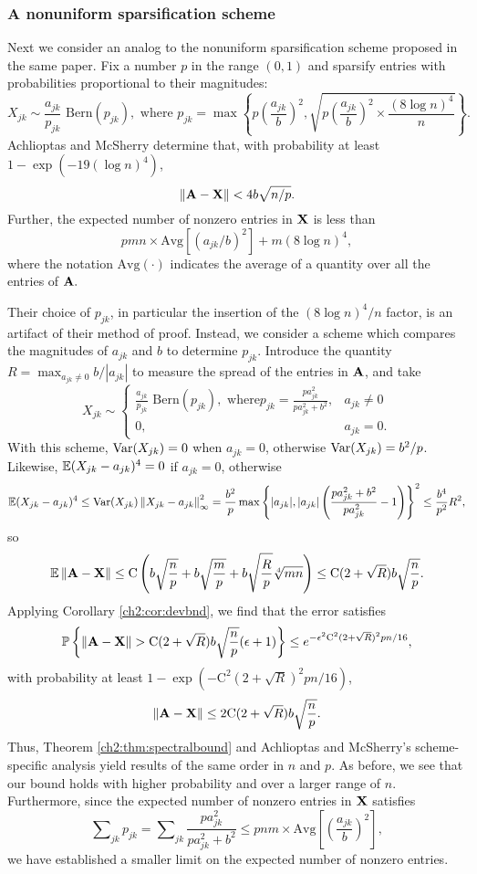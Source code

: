 \subsubsection{A nonuniform sparsification scheme}
Next we consider an analog to the nonuniform sparsification scheme proposed in
the same paper. Fix a number $p$ in the range $(0,1)$ and sparsify entries with
probabilities proportional to their magnitudes: 
\[
X_{jk}\sim \frac{a_{jk}}{p_{jk}}\text{ Bern}(p_{jk}), \text{ where }
p_{jk}=\max\left\{
p\left(\frac{a_{jk}}{b}\right)^{2},\sqrt{p\left(\frac{a_{jk}}{b}\right)^{2}
\times\frac{(8\log n)^{4}}{n}}\right\}.
\]
Achlioptas and McSherry determine that, with probability at least $1 -
\exp(-19(\log n)^4)$,
\[
\left\|\mathbf{A}-\mathbf{X}\right\|<4b\sqrt{n/p}.
\]
Further, the expected number of nonzero entries in $\mathbf{X}$ is less than
\begin{equation}
pmn\times\text{Avg}[(a_{jk}/b)^{2}]+m(8\log n)^{4},
\end{equation}
where the notation $\text{Avg}(\cdot)$ indicates the average of a
quantity over all the entries of $\mathbf{A}.$

Their choice of $p_{jk}$, in particular the insertion of the $(8\log n)^{4}/n$
factor, is an artifact of their method of proof. Instead, we consider a scheme
which compares the magnitudes of $a_{jk}$ and $b$ to determine $p_{jk}$.
Introduce the quantity $R=\max_{a_{jk}\neq0}b/|a_{jk}|$ to
measure the spread of the entries in $\mathbf{A}$, and take 
\[
X_{jk} \sim 
\begin{cases}
\frac{a_{jk}}{p_{jk}}\text{ Bern}(p_{jk}),\text{ where
}p_{jk}=\frac{pa_{jk}^{2}}{pa_{jk}^{2}+b^{2}}, & a_{jk}\neq0\\
0, & a_{jk}=0.
\end{cases}
\]
With this scheme, $\operatorname{Var}(X_{jk})=0$ when $a_{jk}=0$, otherwise
$\operatorname{Var}(X_{jk})=b^{2}/p$.
Likewise, $\mathbb{E}(X_{jk}-a_{jk})^{4}=0$ if $a_{jk}=0$, otherwise 
\[
\mathbb{E}(X_{jk}-a_{jk})^{4}\leq\operatorname{Var}(X_{jk})\left\|X_{jk}-a_{jk}\right\|_{\infty}^{2}=\frac{b^{
2}}{p}\max\left\{|a_{jk}|,|a_{jk}|\left(\frac{pa_{jk}^{2}+b^{2}}{pa_{jk}^{2}}
-1\right)\right\}^{2}\leq\frac{b^{4}}{p^{2}}R^{2},
\]
so \[
\mathbb{E}\left\|\mathbf{A}-\mathbf{X}\right\|\leq
\mathrm{C}\left(b\sqrt{\frac{n}{p}}+b\sqrt{\frac{m}{p}}+b\sqrt{\frac{R}{p}}\sqrt
[4]{mn}\right)\leq \mathrm{C}(2+\sqrt{R})b\sqrt{\frac{n}{p}}.
\]
Applying Corollary \ref{ch2:cor:devbnd}, we find that the error satisfies
\[
\Prob{\norm{\mat{A}-\mat{X}}>\mathrm{C}(2+\sqrt{R})b\sqrt{\frac{n}{p}}
(\epsilon+1)}\leq e^{-\epsilon^{2}\mathrm{C}^{2}(2+\sqrt{R})^{2}pn/16},
\]
with probability at least $1-\exp(-\mathrm{C}^{2}(2+\sqrt{R})^{2}pn/16)$,
\[
\left\|\mathbf{A}-\mathbf{X}\right\|\leq2\mathrm{C}(2+\sqrt{R})b\sqrt{\frac{n}{p}}.
\]
Thus, Theorem \ref{ch2:thm:spectralbound} and Achlioptas and McSherry's
scheme-specific analysis yield results of the same order in $n$ and $p$. As
before, we see that our bound holds with higher probability and over a larger
range of $n$. Furthermore, since the expected number of nonzero entries in
$\mathbf{X}$ satisfies 
\[
\sum\nolimits_{jk}p_{jk} = \sum\nolimits_{jk} \frac{pa_{jk}^2}{pa_{jk}^2 +
b^2}\leq pnm\times \text{Avg}\left[\left(\frac{a_{jk}}{b}\right)^2\right],
\]
we have established a smaller limit on the expected number of nonzero entries.  

